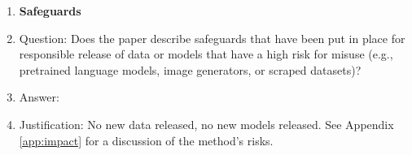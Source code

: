 \begin{enumerate}
\item {\bf Safeguards}
    \item[] Question: Does the paper describe safeguards that have been put in place for responsible release of data or models that have a high risk for misuse (e.g., pretrained language models, image generators, or scraped datasets)?
    \item[] Answer: \answerNA{} %
    \item[] Justification: No new data released, no new models released. See Appendix \ref{app:impact} for a discussion of the method's risks.


\end{enumerate}
